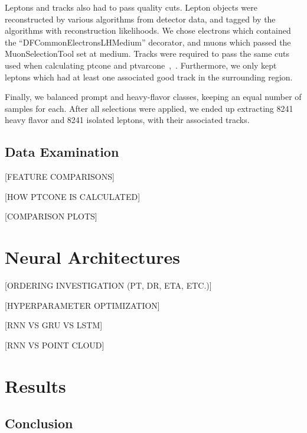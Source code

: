 Leptons and tracks also had to pass quality cuts. Lepton objects were reconstructed by various algorithms from detector data, and tagged by the algorithms with reconstruction likelihoods. We chose electrons which contained the “DFCommonElectronsLHMedium” decorator, and muons which passed the MuonSelectionTool set at medium. Tracks were required to pass the same cuts used when calculating ptcone and ptvarcone~\cite{run2isolation},~\cite{trackingcp}. Furthermore, we only kept leptons which had at least one associated good track in the surrounding region.



Finally, we balanced prompt and heavy-flavor classes, keeping an equal number of samples for each. After all selections were applied, we ended up extracting 8241 heavy flavor and 8241 isolated leptons, with their associated tracks.


\section{Data Examination}\label{sec:dataexamination}

[FEATURE COMPARISONS]

[HOW PTCONE IS CALCULATED]

[COMPARISON PLOTS]

\chapter{Neural Architectures}\label{sec:architecture}

[ORDERING INVESTIGATION (PT, DR, ETA, ETC.)]

[HYPERPARAMETER OPTIMIZATION]

[RNN VS GRU VS LSTM]

[RNN VS POINT CLOUD]

\chapter{Results}

\section{Conclusion}